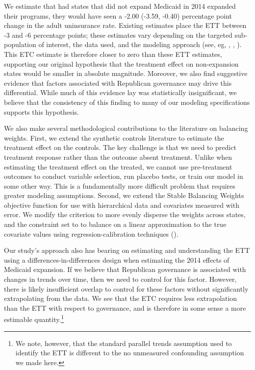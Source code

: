 \documentclass[12pt]{article}
\begin{document}
We estimate that had states that did not expand Medicaid in 2014 expanded their programs, they would have seen a -2.00 (-3.59, -0.40) percentage point change in the adult uninsurance rate. Existing estimates place the ETT between -3 and -6 percentage points; these estimates vary depending on the targeted sub-population of interest, the data used, and the modeling approach (see, eg, \cite{courtemanche2017early}, \cite{kaestner2017effects}, \cite{frean2017premium}). This ETC estimate is therefore closer to zero than these ETT estimates, supporting our original hypothesis that the treatment effect on non-expansion states would be smaller in absolute magnitude. Moreover, we also find suggestive evidence that factors associated with Republican governance may drive this differential. While much of this evidence lay was statistically insignificant, we believe that the consistency of this finding to many of our modeling specifications supports this hypothesis.

We also make several methodological contributions to the literature on balancing weights. First, we extend the synthetic controls literature to estimate the treatment effect on the controls. The key challenge is that we need to predict treatment response rather than the outcome absent treatment. Unlike when estimating the treatment effect on the treated, we cannot use pre-treatment outcomes to conduct variable selection, run placebo tests, or train our model in some other way. This is a fundamentally more difficult problem that requires greater modeling assumptions. Second, we extend the Stable Balancing Weights objective function for use with hierarchical data and covariates measured with error. We modify the criterion to more evenly disperse the weights across states, and the constraint set to to balance on a linear approximation to the true covariate values using regression-calibration techniques (\cite{gleser1992importance}).

Our study's approach also has bearing on estimating and understanding the ETT using a differences-in-differences design when estimating the 2014 effects of Medicaid expansion. If we believe that Republican governance is associated with changes in trends over time, then we need to control for this factor. However, there is likely insufficient overlap to control for these factors without significantly extrapolating from the data. We see that the ETC requires less extrapolation than the ETT with respect to governance, and is therefore in some sense a more estimable quantity.\footnote{We note, however, that the standard parallel trends assumption used to identify the ETT is different to the no unmeasured confounding assumption we made here.} 
\end{document}
